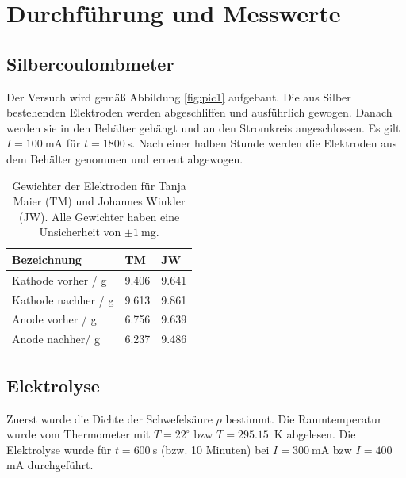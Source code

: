 \documentclass{article}
\begin{document}
\section{Durchführung und Messwerte}

\subsection{Silbercoulombmeter}
Der Versuch wird gemäß Abbildung \ref{fig:pic1} aufgebaut. Die aus Silber bestehenden Elektroden werden abgeschliffen und ausführlich gewogen. Danach werden sie in den Behälter gehängt und an den Stromkreis angeschlossen. Es gilt $I=100~$mA für $t=1800~$s. Nach einer halben Stunde werden die Elektroden aus dem Behälter genommen und erneut abgewogen.

\begin{table}[H]
\caption{Gewichter der Elektroden für Tanja Maier (TM) und Johannes Winkler (JW). Alle Gewichter haben eine Unsicherheit von $\pm 1~$mg.}

\begin{tabular}{l|ll}
Bezeichnung & TM & JW \\
\hline
Kathode vorher / g & 9.406 & 9.641 \\
Kathode nachher / g & 9.613 & 9.861 \\
Anode vorher / g & 6.756 & 9.639  \\
Anode nachher/ g & 6.237 & 9.486 \\
\end{tabular}

\end{table}



\subsection{Elektrolyse}
Zuerst wurde die Dichte der Schwefelsäure $\rho$ bestimmt. Die Raumtemperatur wurde vom Thermometer mit $T=22^\circ$ bzw $T=295.15$~K abgelesen. Die Elektrolyse wurde für $t=600~$s (bzw. 10 Minuten) bei $I=300~$mA bzw $I=400~$mA durchgeführt.
\end{document}
